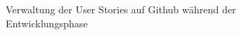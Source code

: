 \begin{figure}
	\centering
	\caption{Verwaltung der User Stories auf Github während der Entwicklungsphase}
	\label{fig:stories}
\end{figure}


